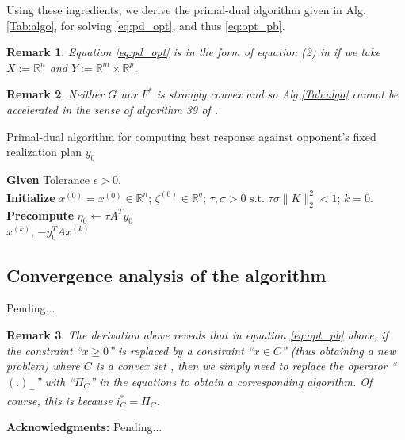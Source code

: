 \documentclass[a4paper,9pt,journal]{IEEEtran}
\newtheorem{remark}{Remark}
\begin{document}
Using these ingredients, we derive the primal-dual algorithm given in Alg.\ref{Tab:algo}, 
for solving \eqref{eq:pd_opt}, and thus \eqref{eq:opt_pb}.

\begin{remark}
Equation \eqref{eq:pd_opt} is in the form of equation (2) in \cite{chambolle2010} if we take $X := \mathbb{R}^n$ and
$Y := \mathbb{R}^m \times \mathbb{R}^p$.
\end{remark}

\begin{remark}
Neither $G$ nor $F^*$ is strongly convex and so Alg.\ref{Tab:algo} cannot be accelerated in the sense of algorithm 39 of \cite{chambolle2010}.
\end{remark}

\begin{algorithm}[htb]
  \caption{Primal-dual algorithm for computing best response against opponent's fixed realization plan $y_0$}
  \textbf{Given} Tolerance $\epsilon > 0$.\\
  \textbf{Initialize} $\tilde{x^{(0)}} = x^{(0)} \in \mathbb{R}^n$; $\zeta^{(0)} \in \mathbb{R}^{q}$;
  $\tau, \sigma > 0 \text{ s.t. }\tau\sigma \|K\|_2^2 < 1$; $k = 0$.\\
  \textbf{Precompute} $\eta_0 \leftarrow \tau A^Ty_0$\\
   \Return $x^{(k)}$, $-y_0^TAx^{(k)}$
  \label{Tab:algo}
\end{algorithm}

\subsection{Convergence analysis of the algorithm}
Pending...

\begin{remark}
The derivation above reveals that in equation \eqref{eq:opt_pb} above, if the constraint ``$x \ge 0$'' is replaced by
a constraint ``$x \in C$'' (thus obtaining a new problem) where $C$ is a convex set
, then we simply need to replace the operator ``$(.)_+$''
with ``$\Pi_C$'' in the equations to obtain a corresponding algorithm. Of course, this is because $i_C^* = \Pi_C$.
\end{remark}

\medskip \noindent
\textbf{Acknowledgments:}
Pending...

 
\end{document}
